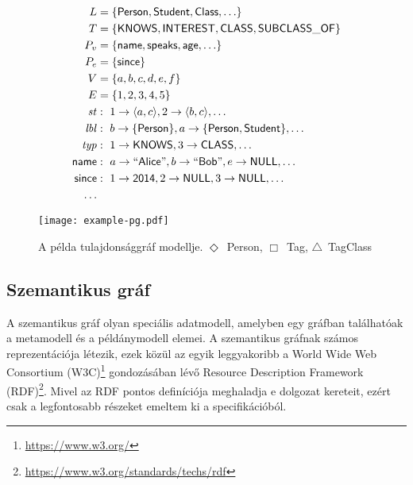 \begin{align*}
	L &= \{\mathsf{Person}, \mathsf{Student}, \mathsf{Class}, \ldots \}\\
	T &= \{\mathsf{KNOWS}, \mathsf{INTEREST}, \mathsf{CLASS}, \mathsf{SUBCLASS\_OF}\}\\
	P_v &= \{\mathsf{name}, \mathsf{speaks}, \mathsf{age}, \ldots\}\\
	P_e &= \{\mathsf{since}\}\\
	V &= \{a, b, c, d, e, f\}\\E &= \{1, 2, 3, 4, 5\}\\
	\mathit{st}&:\ 1 \rightarrow \langle a, c \rangle, 2 \rightarrow \langle b, c \rangle, \ldots\\
	\mathit{lbl}&:\ b \rightarrow \{\mathsf{Person}\}, a \rightarrow \{\mathsf{Person}, \mathsf{Student}\}, \ldots\\
	\mathit{typ}&:\ 1 \rightarrow \mathsf{KNOWS}, 3 \rightarrow \mathsf{CLASS}, \ldots\\
	\mathsf{name}&:\ a \rightarrow \mathsf{``Alice"}, b \rightarrow \mathsf{``Bob"}, e \rightarrow \mathsf{NULL}, \ldots\\
	\mathsf{since}&:\ 1 \rightarrow \mathsf{2014}, 2 \rightarrow \mathsf{NULL}, 3 \rightarrow \mathsf{NULL}, \ldots \\
	\ldots
\end{align*}
\begin{figure}
	\centering
	\texttt{[image: example-pg.pdf]}
	\caption{A példa tulajdonsággráf modellje. $\Diamond$~Person, $\Box$~Tag, $\triangle$~TagClass}
	\label{fig:example-pg}
\end{figure}
\subsection{Szemantikus gráf}

A szemantikus gráf olyan speciális adatmodell, amelyben egy gráfban találhatóak a metamodell és a példánymodell elemei. A szemantikus gráfnak számos reprezentációja létezik, ezek közül az egyik leggyakoribb a World Wide Web Consortium (W3C)\footnote{\url{https://www.w3.org/}} gondozásában lévő Resource Description Framework (RDF)\footnote{\url{https://www.w3.org/standards/techs/rdf}}. Mivel az RDF pontos definíciója meghaladja e dolgozat kereteit, ezért csak a legfontosabb részeket emeltem ki a specifikációból.

